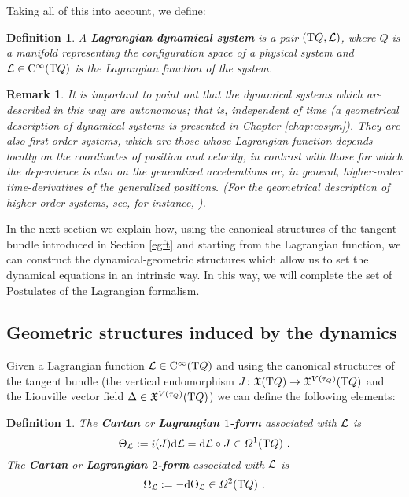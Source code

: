 \documentclass[12pt]{report}
\newtheorem{definition}[teor]{Definition}
\newtheorem{remark}[teor]{Remark}
\def\vf{\mathfrak X}
\def\df{{\mit\Omega}}
\def\Lag{{\cal L}}
\def\d{{\rm d}}
\def\Tan{{\rm T}}
\def\inn{\mathop{i}\nolimits}
\def\Cinfty{{\rm C}^\infty}
\begin{document}
Taking all of this into account, we define:

\begin{definition}
A \textbf{Lagrangian dynamical system} is a pair $(\Tan Q,\Lag )$,
where $Q$ is a manifold representing the configuration space of
a physical system and $\Lag \in \Cinfty (\Tan Q)$
is the Lagrangian function of the system.
\end{definition}

\begin{remark}{\rm 
It is important to point out that the dynamical systems which are
described in this way are {\sl autonomous}; that is, {\sl independent of time}
(a geometrical description of {\sl  dynamical systems} 
is presented in Chapter \ref{chap:cosym}).
They are also {\sl first-order} systems,
which are those  whose Lagrangian function 
depends locally on the coordinates of position and velocity,
in contrast with those for which the dependence is also on the
{\sl generalized accelerations} or, in general, 
higher-order time-derivatives of the generalized positions.
(For the geometrical description of {\sl higher-order} systems, 
see, for instance, \cite{BGG-2015,proc:Cantrijn_Crampin_Sarlet86,
art:Carinena_Lopez92,LR-os,GPR-higher,
art:Gracia_Pons_Roman92,art:Krupkova00,
art:Prieto_Roman11,art:Prieto_Roman12,art:Prieto_Roman15}).
}\end{remark}

In the next section we explain how, using the canonical structures of the
tangent bundle introduced in Section  \ref{egft} and starting from the Lagrangian function,
we can construct the dynamical-geometric structures which allow us to
set the dynamical equations in an intrinsic way.
In this way, we will complete the set of Postulates of the Lagrangian formalism.


\subsection{Geometric structures induced by the dynamics}


Given a Lagrangian function $\Lag \in \Cinfty (\Tan Q)$ and
using the canonical structures of the tangent bundle
(the vertical endomorphism 
$J \colon \vf (\Tan Q) \to \vf^{V(\tau_Q)}(\Tan Q)$
and the Liouville vector field $\Delta \in \vf^{V(\tau_Q)}(\Tan Q)$)
we can define the following elements:

\begin{definition}
The \textbf{Cartan} or \textbf{Lagrangian $1$-form} associated with $\Lag$ is
$$
\Theta_\Lag := \inn(J)\d\Lag=\d \Lag \circ J \in \df^1(\Tan Q) \ .
$$
The \textbf{Cartan}  or \textbf{Lagrangian $2$-form} associated with $\Lag$ is
$$
\Omega_\Lag := -\d \Theta_\Lag \in \df^2(\Tan Q) \ .
$$
\end{definition}
\end{document}
